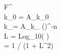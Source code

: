   F^{\alpha}\\
k_0  = A_{k_0}\\
k_\infty  = A_{k_\infty} \left(\right)^{-n} \\
L = \mbox{Log}_{10}( )\\
\alpha = 1 / (1 + L^2)
